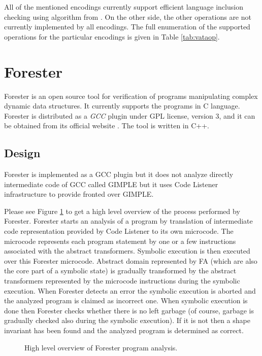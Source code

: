All of the mentioned encodings currently support efficient language inclusion checking using algorithm
from \cite{tacas10}.
On the other side, the other operations are not currently implemented by all encodings.
The full enumeration of the supported operations for the particular encodings is given in Table \ref{tab:vataop}.



\section{Forester}
\label{sec:FA}

Forester is an open source tool for verification of programs manipulating
complex dynamic data structures.
It currently supports the programs in C language.
Forester is distributed as a \emph{GCC} plugin under GPL license, version 3,
and it can be obtained from its official website \cite{www:forester}.
The tool is written in C++.

\subsection{Design}

Forester is implemented as a GCC plugin but it does not analyze directly intermediate code of GCC called GIMPLE but it
uses Code Listener infrastructure \cite{cl11} to provide fronted over GIMPLE.

Please see Figure \ref{fig:fa_exec} to get a high level overview of the process performed by Forester. 
Forester starts an analysis of a program by translation of intermediate
code representation provided by Code Listener to its own microcode.
The microcode represents each program statement by one
or a few instructions associated with the abstract transformers.
Symbolic execution is then executed over this Forester microcode.
Abstract domain represented by FA (which are also the core part of a symbolic state) is gradually transformed by the abstract transformers
represented by the microcode instructions during the symbolic execution.
When Forester detects an error the symbolic execution is aborted and
the analyzed program is claimed as incorrect one.
When symbolic execution is done then Forester checks whether there is no left garbage
(of course, garbage is gradually checked also during the symbolic execution).
If it is not then a shape invariant has been found and the analyzed program is determined as correct.

\begin{figure}[bt]
	\begin{center}
		
	\end{center}
	\caption{High level overview of Forester program analysis.}
	\label{fig:fa_exec}
\end{figure}

